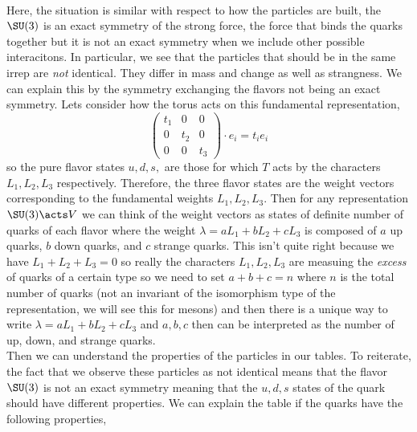 \documentclass[12pt]{article}
\begin{document}
\bigskip\\
Here, the situation is similar with respect to how the particles are built, the $\SU(3)$ is an exact symmetry of the strong force, the force that binds the quarks together but it is not an exact symmetry when we include other possible interacitons. In particular, we see that the particles that should be in the same irrep are \textit{not} identical. They differ in mass and change as well as strangness. We can explain this by the symmetry exchanging the flavors not being an exact symmetry. Lets consider how the torus acts on this fundamental representation,
\[ \begin{pmatrix}
t_1 & 0 & 0
\\
0 & t_2 & 0
\\
0 & 0 & t_3 
\end{pmatrix}
\cdot e_i = t_i e_i 
\]
so the pure flavor states $u,d,s,$ are those for which $T$ acts by the characters $L_1, L_2, L_3$ respectively. Therefore, the three flavor states are the weight vectors corresponding to the fundamental weights $L_1, L_2, L_3$. Then for any representation $\SU(3) \acts V$ we can think of the weight vectors as states of definite number of quarks of each flavor where the weight $\lambda = a L_1 + b L_2 + c L_3$ is composed of $a$ up quarks, $b$ down quarks, and $c$ strange quarks. This isn't quite right because we have $L_1 + L_2 + L_3 = 0$ so really the characters $L_1, L_2, L_3$ are measuing the \textit{excess} of quarks of a certain type so we need to set $a + b + c = n$ where $n$ is the total number of quarks (not an invariant of the isomorphism type of the representation, we will see this for mesons) and then there is a unique way to write $\lambda = a L_1 + b L_2 + c L_3$ and $a,b,c$ then can be interpreted as the number of up, down, and strange quarks.
\bigskip\\
Then we can understand the properties of the particles in our tables. To reiterate, the fact that we observe these particles as not identical means that the flavor $\SU(3)$ is not an exact symmetry meaning that the $u,d,s$ states of the quark should have different properties. We can explain the table if the quarks have the following properties, 
\end{document}
